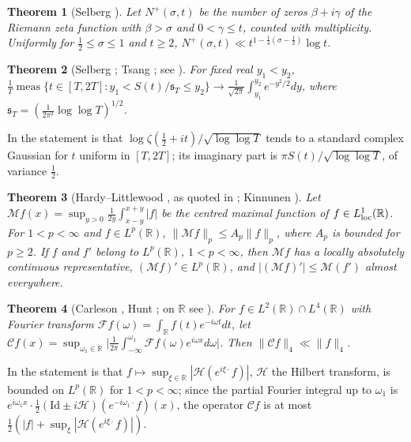 \documentclass[preprint,12pt]{elsarticle}
\numberwithin{equation}{section}
\theoremstyle{plain}
\newtheorem{theorem}{Theorem}[section]
\theoremstyle{definition}
\theoremstyle{remark}
\newcommand{\R}{\mathbb R}
\begin{document}
\begin{theorem}[Selberg {\cite[Thm.~9.19(C)]{Titchmarsh1986}}]\label{thm:known_density}
Let $N^+(\sigma,t)$ be the number of zeros $\beta+i\gamma$ of the Riemann zeta function with $\beta>\sigma$ and $0<\gamma\le t$, counted with multiplicity. Uniformly for $\frac12\le\sigma\le1$ and $t\ge2$, $N^+(\sigma,t)\ll t^{1-\frac14(\sigma-\frac12)}\log t$.
\end{theorem}

\begin{theorem}[Selberg {\cite{Selberg1946a}}; Tsang {\cite{Tsang1984}}; see {\cite[(1.1)]{FazzariGerspachMinelli2025}}]\label{thm:known_selberg_clt}
For fixed real $y_1<y_2$, $\frac1T\operatorname{meas}\{t\in[T,2T]:y_1<S(t)/\mathfrak s_T\le y_2\}\to\frac1{\sqrt{2\pi}}\int_{y_1}^{y_2}e^{-y^2/2}dy$, where $\mathfrak s_T=(\frac1{2\pi^2}\log\log T)^{1/2}$.
\end{theorem}
In \cite{FazzariGerspachMinelli2025} the statement is that $\log\zeta(\frac12+it)/\sqrt{\log\log T}$ tends to a standard complex Gaussian for $t$ uniform in $[T,2T]$; its imaginary part is $\pi S(t)/\sqrt{\log\log T}$, of variance $\frac12$.

\begin{theorem}[Hardy--Littlewood {\cite[Thm.~I.1]{Stein1970}}, as quoted in {\cite[(1.2)]{Kinnunen1997}}; Kinnunen {\cite[Thm.~1.4]{Kinnunen1997}}]\label{thm:known_maximal}
Let $\mathcal Mf(x)=\sup_{y>0}\frac1{2y}\int_{x-y}^{x+y}|f|$ be the centred maximal function of $f\in L^1_{\rm loc}(\R)$. For $1<p<\infty$ and $f\in L^p(\R)$, $\|\mathcal Mf\|_p\le A_p\|f\|_p$, where $A_p$ is bounded for $p\ge2$. If $f$ and $f'$ belong to $L^p(\R)$, $1<p<\infty$, then $\mathcal Mf$ has a locally absolutely continuous representative, $(\mathcal Mf)'\in L^p(\R)$, and $|(\mathcal Mf)'|\le\mathcal M(f')$ almost everywhere.
\end{theorem}

\begin{theorem}[Carleson {\cite{Carleson1966}}, Hunt {\cite{Hunt1968}}; on $\R$ see {\cite{Lerner2013}}]\label{thm:known_carleson}
For $f\in L^2(\R)\cap L^4(\R)$ with Fourier transform $\mathcal Ff(\omega)=\int_\R f(t)e^{-i\omega t}dt$, let $\mathcal Cf(x)=\sup_{\omega_1\in\R}\bigl|\frac1{2\pi}\int_{-\infty}^{\omega_1}\mathcal Ff(\omega)e^{i\omega x}d\omega\bigr|$. Then $\|\mathcal Cf\|_4\ll\|f\|_4$.
\end{theorem}
In \cite{Lerner2013} the statement is that $f\mapsto\sup_{\xi\in\R}|\mathcal H(e^{i\xi\cdot}f)|$, $\mathcal H$ the Hilbert transform, is bounded on $L^p(\R)$ for $1<p<\infty$; since the partial Fourier integral up to $\omega_1$ is $e^{i\omega_1x}\cdot\frac12(\mathrm{Id}\pm i\mathcal H)(e^{-i\omega_1\cdot}f)(x)$, the operator $\mathcal Cf$ is at most $\frac12(|f|+\sup_\xi|\mathcal H(e^{i\xi\cdot}f)|)$.
\end{document}
